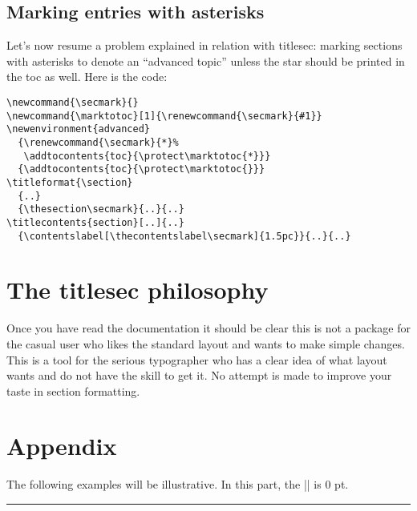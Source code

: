 \documentclass[a4paper]{ltxguide}
\newcommand{\examplesep}{%
  \begin{center}%
    \rule{4pt}{4pt}%
  \end{center}}
\begin{document}
\subsection{Marking entries with asterisks}

Let's now resume a problem explained in relation with
\textsf{titlesec}: marking sections with asterisks to
denote an ``advanced topic'' unless the star should
be printed in the toc as well. Here is the code:
\begin{verbatim}
\newcommand{\secmark}{}
\newcommand{\marktotoc}[1]{\renewcommand{\secmark}{#1}}
\newenvironment{advanced}
  {\renewcommand{\secmark}{*}%
   \addtocontents{toc}{\protect\marktotoc{*}}}
  {\addtocontents{toc}{\protect\marktotoc{}}}
\titleformat{\section}
  {..}
  {\thesection\secmark}{..}{..}
\titlecontents{section}[..]{..}
  {\contentslabel[\thecontentslabel\secmark]{1.5pc}}{..}{..}
\end{verbatim}

\section{The \textsf{titlesec} philosophy}

Once you have read the documentation it should be clear this
is not a package for the casual user who likes the standard
layout and wants to make simple changes. This is a tool for the
serious typographer who has a clear idea of what layout wants
and do not have the skill to get it. No attempt is made to improve
your taste in section formatting.

\section{Appendix}

The following examples will be illustrative. In this part, the
|\parskip| is 0 pt.

\begingroup

\setlength{\parskip}{0pt}

\examplesep

\titleformat{\section}[block]
  {\normalfont\bfseries\filcenter}{\fbox{\itshape\thesection}}{1em}{}
\end{document}
